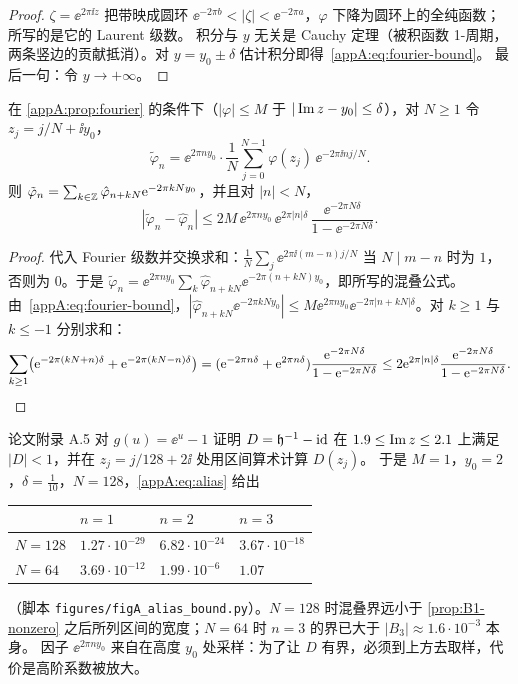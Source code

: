 \begin{proof}
$\zeta=\ee^{2\pi\ii z}$ 把带映成圆环 $\ee^{-2\pi b}<|\zeta|<\ee^{-2\pi a}$，$\varphi$ 下降为圆环上的全纯函数；所写的是它的 Laurent 级数。
积分与 $y$ 无关是 Cauchy 定理（被积函数 1-周期，两条竖边的贡献抵消）。对 $y=y_0\pm\delta$ 估计积分即得~\eqref{appA:eq:fourier-bound}。
最后一句：令 $y\to+\infty$。
\end{proof}

\begin{proposition}[周期梯形公式的混叠误差]\label{appA:prop:trapezoid}
在 \cref{appA:prop:fourier} 的条件下（$|\varphi|\le M$ 于 $|\operatorname{Im} z-y_0|\le\delta$），对 $N\ge1$ 令 $z_j=j/N+\ii y_0$，
\[
  \tilde\varphi_n=\ee^{2\pi ny_0}\cdot\frac1N\sum_{j=0}^{N-1}\varphi(z_j)\,\ee^{-2\pi\ii nj/N} .
\]
则 $\tilde\varphi_n=\sum_{k\in\mathbb{Z}}\hat\varphi_{n+kN}\mathrm{e}^{-2\pi kNy_0}$，并且对 $|n|<N$，
\begin{equation}\label{appA:eq:alias}
  |\tilde\varphi_n-\hat\varphi_n|\le2M\,\ee^{2\pi ny_0}\,\ee^{2\pi|n|\delta}\,\frac{\ee^{-2\pi N\delta}}{1-\ee^{-2\pi N\delta}} .
\end{equation}
\end{proposition}

\begin{proof}
代入 Fourier 级数并交换求和：$\frac1N\sum_j\ee^{2\pi\ii(m-n)j/N}$ 当 $N\mid m-n$ 时为 $1$，否则为 $0$。于是
$\tilde\varphi_n=\ee^{2\pi ny_0}\sum_k\hat\varphi_{n+kN}\ee^{-2\pi(n+kN)y_0}$，即所写的混叠公式。
由~\eqref{appA:eq:fourier-bound}，$|\hat\varphi_{n+kN}\ee^{-2\pi kNy_0}|\le M\ee^{2\pi ny_0}\ee^{-2\pi|n+kN|\delta}$。对 $k\ge1$ 与 $k\le-1$ 分别求和：
\[
  \sum_{k\ge1}\bigl(\mathrm{e}^{-2\pi(kN+n)\delta}+\mathrm{e}^{-2\pi(kN-n)\delta}\bigr)=(\mathrm{e}^{-2\pi n\delta}+\mathrm{e}^{2\pi n\delta})\frac{\mathrm{e}^{-2\pi N\delta}}{1-\mathrm{e}^{-2\pi N\delta}}\le2\mathrm{e}^{2\pi|n|\delta}\frac{\mathrm{e}^{-2\pi N\delta}}{1-\mathrm{e}^{-2\pi N\delta}} .\qedhere
\]
\end{proof}

\begin{example}\label{appA:ex:alias}
论文附录 A.5 对 $g(u)=\ee^u-1$ 证明 $D=\mathfrak h^{-1}-\mathrm{id}$ 在 $1.9\le\operatorname{Im} z\le2.1$ 上满足 $|D|<1$，并在 $z_j=j/128+2\ii$ 处用区间算术计算 $D(z_j)$。
于是 $M=1$，$y_0=2$，$\delta=\tfrac1{10}$，$N=128$，\eqref{appA:eq:alias} 给出
\begin{center}\small
\begin{tabular}{llll}
\toprule
& $n=1$ & $n=2$ & $n=3$\\
\midrule
$N=128$ & $1.27\cdot10^{-29}$ & $6.82\cdot10^{-24}$ & $3.67\cdot10^{-18}$\\
$N=64$ & $3.69\cdot10^{-12}$ & $1.99\cdot10^{-6}$ & $1.07$\\
\bottomrule
\end{tabular}
\end{center}
（脚本 \texttt{figures/figA\_alias\_bound.py}）。$N=128$ 时混叠界远小于 \cref{prop:B1-nonzero} 之后所列区间的宽度；$N=64$ 时 $n=3$ 的界已大于 $|B_3|\approx1.6\cdot10^{-3}$ 本身。
因子 $\ee^{2\pi ny_0}$ 来自在高度 $y_0$ 处采样：为了让 $D$ 有界，必须到上方去取样，代价是高阶系数被放大。
\end{example}

